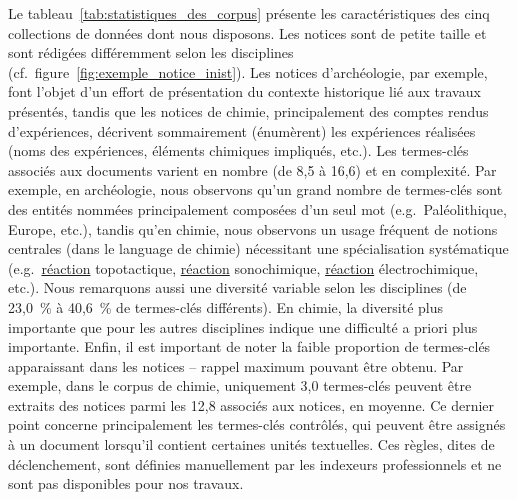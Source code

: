   Le tableau~\ref{tab:statistiques_des_corpus} présente les caractéristiques des
  cinq collections de données dont nous disposons. Les notices sont de petite
  taille et sont rédigées différemment selon les disciplines
  (cf.~figure~\ref{fig:exemple_notice_inist}). Les notices d'archéologie, par
  exemple, font l'objet d'un effort de présentation du contexte historique lié
  aux travaux présentés, tandis que les notices de chimie, principalement des
  comptes rendus d'expériences, décrivent sommairement (énumèrent) les
  expériences réalisées (noms des expériences, éléments chimiques impliqués,
  etc.). Les termes-clés associés aux documents varient en nombre (de 8,5 à
  16,6) et en complexité. Par exemple, en archéologie, nous observons qu'un
  grand nombre de termes-clés sont des entités nommées principalement composées
  d'un seul mot (e.g.~\og{}Paléolithique\fg{}, \og{}Europe\fg{}, etc.), tandis
  qu'en chimie, nous observons un usage fréquent de notions centrales (dans le
  language de chimie) nécessitant une spécialisation systématique
  (e.g.~\og{}\underline{réaction} topotactique\fg{}, \og{}\underline{réaction}
  sonochimique\fg{}, \og{}\underline{réaction} électrochimique\fg{}, etc.).
  Nous remarquons aussi une diversité variable selon les disciplines (de 23,0~\%
  à 40,6~\% de termes-clés différents). En chimie, la diversité plus importante
  que pour les autres disciplines indique une difficulté a priori plus
  importante. Enfin, il est important de noter la faible proportion de
  termes-clés apparaissant dans les notices -- rappel maximum pouvant être
  obtenu. Par exemple, dans le corpus de chimie, uniquement 3,0 termes-clés
  peuvent être extraits des notices parmi les 12,8 associés aux notices, en
  moyenne. Ce dernier point concerne principalement les termes-clés contrôlés,
  qui peuvent être assignés à un document lorsqu'il contient certaines unités
  textuelles. Ces règles, dites de déclenchement, sont définies manuellement par
  les indexeurs professionnels et ne sont pas disponibles pour nos travaux.
